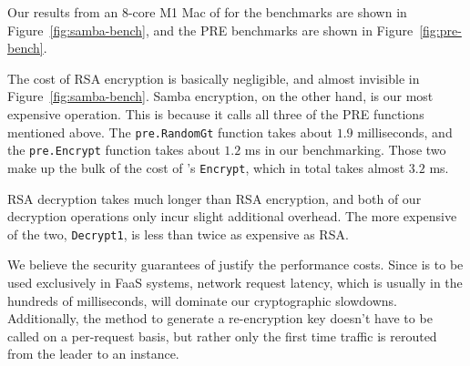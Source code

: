 Our results from an 8-core M1 Mac of for the \SystemName benchmarks are shown in Figure~\ref{fig:samba-bench}, and the PRE benchmarks are shown in Figure~\ref{fig:pre-bench}.

The cost of RSA encryption is basically negligible, and almost invisible in Figure~\ref{fig:samba-bench}. Samba encryption, on the other hand, is our most expensive operation.
This is because it calls all three of the PRE functions mentioned above. The \texttt{pre.RandomGt} function takes about $1.9$ milliseconds, and the \texttt{pre.Encrypt} function takes about $1.2$ ms in our benchmarking.
Those two make up the bulk of the cost of \SystemName's \texttt{Encrypt}, which in total takes almost $3.2$ ms. 

RSA decryption takes much longer than RSA encryption, and both of our \SystemName decryption operations only incur slight additional overhead. The more expensive of the two, \texttt{Decrypt1}, is less than twice as expensive as RSA.

We believe the security guarantees of \SystemName justify the performance costs.
Since \SystemName is to be used exclusively in FaaS systems, network request latency, which is usually in the hundreds of milliseconds, will dominate our cryptographic slowdowns.
Additionally, the method to generate a re-encryption key doesn't have to be called on a per-request basis, but rather only the first time traffic is rerouted from the leader to an instance.
